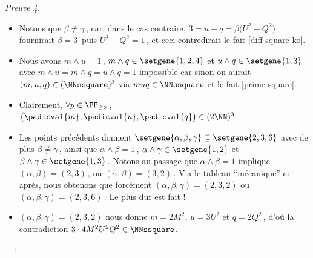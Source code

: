 \begin{proof}[Preuve 4]
\begin{itemize}
		\item Notons que $\beta \neq \gamma$\,, car, dans le cas contraire, $3 = u - q = \beta \big( U^2 - Q^2 \big)$ fournirait $\beta = 3$\, puis $U^2 - Q^2 = 1$\,, et ceci contredirait le fait \ref{diff-square-ko}.


		\item Nous avons $m \wedge u = 1$\,, $m \wedge q \in \setgene{1, 2, 4}$ et $u \wedge q \in \setgene{1, 3}$
		avec $m \wedge u = m \wedge q = u \wedge q = 1$ impossible car sinon on aurait $(m, u, q) \in ( \NNssquare )^3$ via $muq \in \NNssquare$ et le fait \ref{prime-square}.


		\item Clairement, $\forall p \in \PP_{\geq 5}$\,, $\big( \padicval{m} , \padicval{u} , \padicval{q} \big) \in ( 2 \NN )^3$.


		\item Les points précédents donnent 
		$\setgene{\alpha, \beta, \gamma} \subseteq \setgene{2, 3, 6}$
		avec de plus
		$\beta \neq \gamma$\,,
		ainsi que 
		$\alpha \wedge \beta = 1$\,, $\alpha \wedge \gamma \in \setgene{1, 2}$ et $\beta \wedge \gamma \in \setgene{1, 3}$\,.
		Notons au passage que $\alpha \wedge \beta = 1$ implique $(\alpha, \beta) = (2, 3)$\,, ou $(\alpha, \beta) = (3, 2)$\,.
		Via le tableau \enquote{mécanique} ci-après, nous obtenons que forcément $(\alpha, \beta, \gamma) = (2, 3, 2)$ ou $(\alpha, \beta, \gamma) = (2, 3, 6)$\,. Le plus dur est fait !
	\end{itemize}

	\begin{center}
	\end{center}


	\begin{itemize}
		\item $(\alpha, \beta, \gamma) = (2, 3, 2)$ nous donne $m = 2 M^2$, $u = 3 U^2$ et $q = 2 Q^2$\,, d'où la contradiction $3 \cdot4 M^2 U^2 Q^2 \in \NNssquare$.



\end{itemize}
\end{proof}
